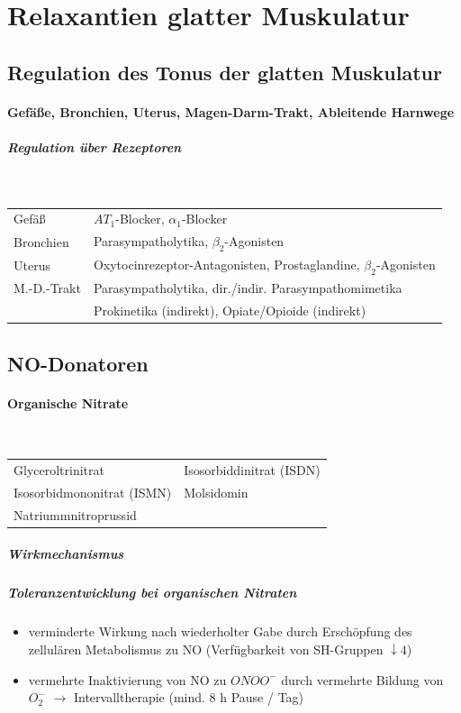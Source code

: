 \documentclass[10pt,a4paper]{report}
\begin{document}
\section{Relaxantien glatter Muskulatur}
\subsection{Regulation des Tonus der glatten Muskulatur}
\paragraph{Gefäße, Bronchien, Uterus, Magen-Darm-Trakt, Ableitende Harnwege}
\subparagraph{Regulation über Rezeptoren} \mbox{} \\

\begin{tabularx}{\textwidth}{XX}
Gefäß&$AT_1$-Blocker, $\alpha_1$-Blocker\\
Bronchien&Parasympatholytika, $\beta_2$-Agonisten\\
Uterus&Oxytocinrezeptor-Antagonisten, Prostaglandine, $\beta_2$-Agonisten\\ 
M.-D.-Trakt&Parasympatholytika, dir./indir. Parasympathomimetika\\
&Prokinetika (indirekt), Opiate/Opioide (indirekt)\\
\end{tabularx}

\subsection{NO-Donatoren}
\paragraph{Organische Nitrate} \mbox{} \\

\begin{tabularx}{\textwidth}{XX}
Glyceroltrinitrat&Isosorbiddinitrat (ISDN)\\
Isosorbidmononitrat (ISMN)&Molsidomin\\
Natriummnitroprussid&\\
\end{tabularx}

\subparagraph{Wirkmechanismus}

\subparagraph{Toleranzentwicklung bei organischen Nitraten}

\begin{itemize}
	\item verminderte Wirkung nach wiederholter Gabe durch Erschöpfung des zellulären Metabolismus zu NO (Verfügbarkeit von SH-Gruppen $\downarrow4$)
	\item vermehrte Inaktivierung von NO zu $ONOO^-$ durch vermehrte Bildung von $O_2^-$ $\rightarrow$ Intervalltherapie (mind. 8 h Pause / Tag)
\end{itemize}
\end{document}
